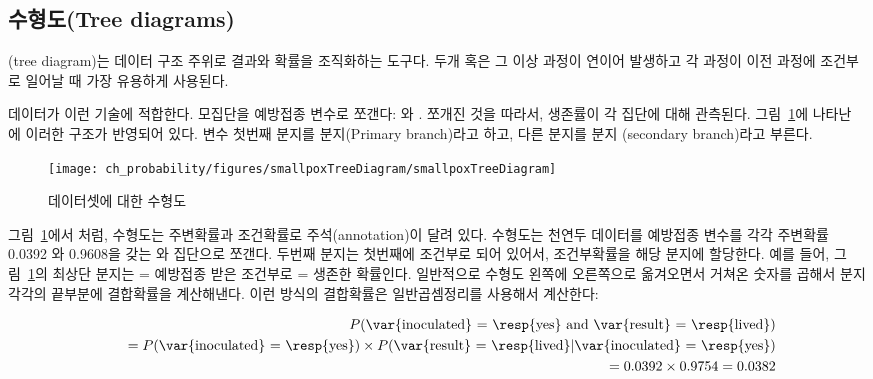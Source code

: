 \subsection{수형도(Tree diagrams)}


(tree diagram)는 데이터 구조 주위로 결과와 확률을 조직화하는 도구다.
두개 혹은 그 이상 과정이 연이어 발생하고 각 과정이 이전 과정에 조건부로 일어날 때 가장 유용하게 사용된다.

 데이터가 이런 기술에 적합한다. 모집단을  예방접종 변수로 쪼갠다:  와 .
쪼개진 것을 따라서, 생존률이 각 집단에 대해 관측된다. 그림~\ref{smallpoxTreeDiagram}에 나타난 에 이러한 구조가 반영되어 있다.  변수 첫번째 분지를  분지(Primary branch)라고 하고, 다른 분지를  분지 (secondary branch)라고 부른다. 

\begin{figure}[ht]
\centering
\texttt{[image: ch\_probability/figures/smallpoxTreeDiagram/smallpoxTreeDiagram]}
\caption{ 데이터셋에 대한 수형도}
\label{smallpoxTreeDiagram}
\end{figure}

그림~\ref{smallpoxTreeDiagram}에서 처럼, 수형도는 주변확률과 조건확률로 주석(annotation)이 달려 있다. 수형도는 천연두 데이터를  예방접종 변수를 각각 주변확률 0.0392 와 0.9608을 갖는  와  집단으로 쪼갠다. 두번째 분지는 첫번째에 조건부로 되어 있어서, 조건부확률을 해당 분지에 할당한다. 예를 들어, 그림~\ref{smallpoxTreeDiagram}의 최상단 분지는  =  예방접종 받은 조건부로  =  생존한 확률인다. 일반적으로 수형도 왼쪽에 오른쪽으로 옮겨오면서 거쳐온 숫자를 곱해서 분지 각각의 끝부분에 결합확률을 계산해낸다. 이런 방식의 결합확률은 일반곱셈정리를 사용해서 계산한다:

\begin{eqnarray*}
&& P(\text{\var{inoculated} = \resp{yes} and \var{result} = \resp{lived}}) \\
	&&\quad = P(\text{\var{inoculated} = \resp{yes}})\times P(\text{\var{result} = \resp{lived}}|\text{\var{inoculated} = \resp{yes}}) \\
	&&\quad = 0.0392\times 0.9754=0.0382
\end{eqnarray*}

